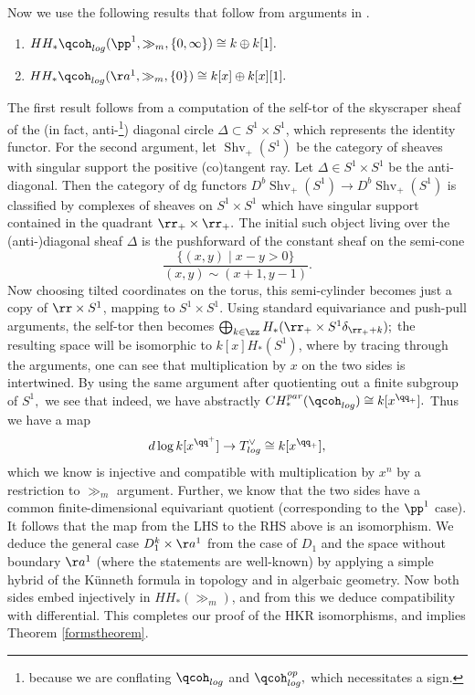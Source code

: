 \documentclass{article}
\newcommand{\shv}{\operatorname{Shv}}
\begin{document}
Now we use the following results that follow from arguments in \cite{vtor}.
\begin{thm}
  \begin{enumerate}
  \item   $HH_*\qcoh_{log}(\pp^1, \gg_m, \{0,\infty\}) \cong k\oplus k[1].$
  \item   $HH_*\qcoh_{log}(\aa^1, \gg_m, \{0\})\cong k[x]\oplus k[x][1].$
  \end{enumerate}

\end{thm}
The first result follows from a computation of the self-tor of the skyscraper sheaf of the (in fact, anti-\footnote{because we are conflating $\qcoh_{log}$ and $\qcoh_{log}^{op},$ which necessitates a sign.}) diagonal circle $\Delta \subset S^1\times S^1$, which represents the identity functor. For the second argument, let $\shv_+(S^1)$ be the category of sheaves with singular support the positive (co)tangent ray. Let $\Delta\in S^1\times S^1$ be the anti-diagonal. Then the category of dg functors $D^b\shv_+(S^1)\to D^b\shv_+(S^1)$ is classified by complexes of sheaves on $S^1\times S^1$ which have singular support contained in the quadrant $\rr_+\times \rr_+.$ The initial such object living over the (anti-)diagonal sheaf $\Delta$ is the pushforward of the constant sheaf on the semi-cone $$\frac{\{(x, y)\mid x-y> 0\}}{(x, y)\sim (x+1, y-1)}.$$ Now choosing tilted coordinates on the torus, this semi-cylinder becomes just a copy of $\rr\times S^1$, mapping to $S^1\times S^1.$ Using standard equivariance and push-pull arguments, the self-tor then becomes $\bigoplus_{k\in \zz}H_*(\rr_+\times S^1 \delta_{\rr_+ + k});$ the resulting space will be isomorphic to $k[x] H_*(S^1)$, where by tracing through the arguments, one can see that multiplication by $x$ on the two sides is intertwined. By using the same argument after quotienting out a finite subgroup of $S^1,$ we see that indeed, we have abstractly $CH_*^{par}(\qcoh_{log})\cong k[x^{\qq_+}].$ Thus we have a map $$d\log k[x^{\qq^+}]\to T^\vee_{log}\cong k[x^{\qq_+}],$$ which we know is injective and compatible with multiplication by $x^n$ by a restriction to $\gg_m$ argument. Further, we know that the two sides have a common finite-dimensional equivariant quotient (corresponding to the $\pp^1$ case). It follows that the map from the LHS to the RHS above is an isomorphism. We deduce the general case $D_1^k\times \aa^1$ from the case of $D_1$ and the space without boundary $\aa^1$ (where the statements are well-known) by applying a simple hybrid of the K\"unneth formula in topology and in algerbaic geometry. Now both sides embed injectively in $HH_*(\gg_m)$, and from this we deduce compatibility with differential. This completes our proof of the HKR isomorphisms, and implies Theorem \ref{formstheorem}.
\end{document}
